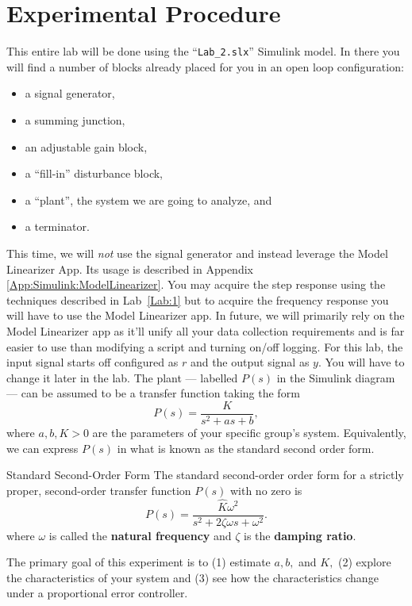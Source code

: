 \section{Experimental Procedure}
This entire lab will be done using the ``\texttt{Lab\_2.slx}'' Simulink model.
In there you will
find a number of blocks already placed for you in an open loop configuration:
\begin{itemize}
  \item{a signal generator,}
  \item{a summing junction,}
  \item{an adjustable gain block,}
  \item{a ``fill-in'' disturbance block,}
  \item{a ``plant'', the system we are going to analyze, and}
  \item{a terminator.}
\end{itemize}
This time, we will \emph{not} use the signal generator and instead leverage
the Model Linearizer App. Its usage is described in Appendix
\ref{App:Simulink:ModelLinearizer}. You may acquire the step response
using the techniques described in Lab~\ref{Lab:1} but to acquire the frequency
response you will have to use the Model Linearizer app. In future, we will primarily rely on the Model Linearizer app as it'll
unify all your data collection
requirements and is far easier to use than modifying a script and turning
on/off logging. For this lab, the input signal starts off configured
as \(r\) and the output signal as \(y.\) You will have to change it later
in the lab.
%
The plant --- labelled \(P(s)\) in the Simulink diagram --- can be assumed
to be a transfer function taking the form
\[
  P(s) = \frac{K}{s^2 + a s + b},
\]
where \(a, b, K > 0\) are the parameters of your specific group's system.
Equivalently, we can express \(P(s)\) in what is known
as the standard second order form.
%
\begin{definition}[]{Standard Second-Order Form}
  The standard second-order order form for a strictly proper, second-order
  transfer function \(P(s)\) with no zero is
  \[
    P(s) = \frac{\hat{K} \omega^2}{s^2 + 2 \zeta \omega s + \omega^2}.
  \]
  where \(\omega\) is called the \textbf{natural frequency} and
  \(\zeta\) is the \textbf{damping ratio}.
\end{definition}
%
The primary goal of this experiment is to (1) estimate \(a,\)\(b,\) and
\(K,\) (2) explore the characteristics of your system and
(3) see how the characteristics change under a proportional error controller.

